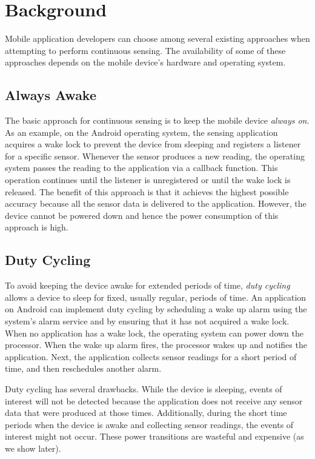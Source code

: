 
\section{Background}
\label{sec:background}

Mobile application developers can choose among several existing approaches when
attempting to perform continuous sensing. The availability of some of these
approaches depends on the mobile device's hardware and operating system.

\subsection{Always Awake}

The basic approach for continuous sensing is to keep the mobile device
\emph{always on}. As an example, on the Android operating system, the sensing
application acquires a wake lock to prevent the device from sleeping and
registers a listener for a specific sensor. Whenever the sensor produces a new
reading, the operating system passes the reading to the application via a
callback function. This operation continues until the listener is unregistered
or until the wake lock is released. The benefit of this approach is that it
achieves the highest possible accuracy because all the sensor data is delivered to the
application. However, the device cannot be powered down and hence the power
consumption of this approach is high.

\subsection{Duty Cycling}

To avoid keeping the device awake for extended periods of time, \emph{duty 
cycling} allows a device to sleep for fixed, usually regular, periods of
time. An application on Android can implement duty cycling by scheduling a wake
up alarm using the system's alarm service and by ensuring that it has not
acquired a wake lock. When no application has a wake lock, the operating system
can power down the processor. When the wake up alarm fires, the processor wakes
up and notifies the application. Next, the application collects sensor readings
for a short period of time, and then reschedules another alarm.

Duty cycling has several drawbacks. While the device is sleeping, events of interest will not be 
detected because the application does not receive any sensor data that were produced at those 
times. Additionally, during the short time periods when the device is awake and collecting 
sensor readings, the events of interest might not occur. These power transitions are wasteful 
and expensive (as we show later). 

